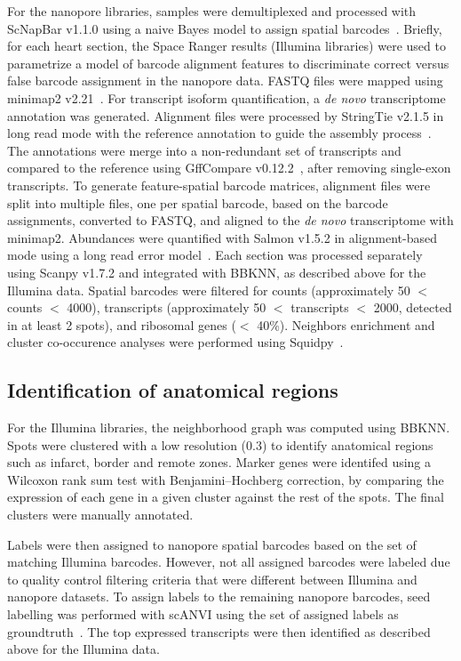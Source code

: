 \documentclass[utf8]{FrontiersinHarvard} %
\newcommand{\denovo}{\textit{de novo}\xspace}
\begin{document}
For the nanopore libraries, samples were demultiplexed and processed with ScNapBar v1.1.0 using a naive Bayes model to assign spatial barcodes~\citep{Wang2021:scnapbar}.
Briefly, for each heart section, the Space Ranger results (Illumina libraries) were used to parametrize a model of barcode alignment features to discriminate correct versus false barcode assignment in the nanopore data. 
FASTQ files were mapped using minimap2 v2.21~\citep{Heng2018:minimap}. 
For transcript isoform quantification, a \denovo transcriptome annotation was generated. 
Alignment files were processed by StringTie v2.1.5 in long read mode with the reference annotation to guide the assembly process~\citep{Kovaka2019:stringtie_long}. 
The annotations were merge into a non-redundant set of transcripts and compared to the reference using GffCompare v0.12.2~\citep{Pertea2020:gff}, after removing single-exon transcripts. 
To generate feature-spatial barcode matrices, alignment files were split into multiple files, one per spatial barcode, based on the barcode assignments, converted to FASTQ, and aligned to the \denovo transcriptome with minimap2. 
Abundances were quantified with Salmon v1.5.2 in alignment-based mode using a long read error model~\citep{Patro2017:salmon}. 
Each section was processed separately using Scanpy v1.7.2 and integrated with BBKNN, as described above for the Illumina data.
Spatial barcodes were filtered for counts (approximately 50 $<$ counts $<$ 4000), transcripts (approximately 50 $<$ transcripts $<$ 2000, detected in at least 2 spots), and ribosomal genes ($<$ 40\%).
Neighbors enrichment and cluster co-occurence analyses were performed using Squidpy~\citep{Palla202:squidpy}.

\subsection*{Identification of anatomical regions}
For the Illumina libraries, the neighborhood graph was computed using BBKNN. Spots were clustered with a low resolution (0.3) to identify anatomical regions such as infarct, border and remote zones. Marker genes were identifed using a Wilcoxon rank sum test with Benjamini–Hochberg correction, by comparing the expression of each gene in a given cluster against the rest of the spots. The final clusters were manually annotated.

Labels were then assigned to nanopore spatial barcodes based on the set of matching Illumina barcodes. 
However, not all assigned barcodes were labeled due to quality control filtering criteria that were different between Illumina and nanopore datasets. 
To assign labels to the remaining nanopore barcodes, seed labelling was performed with scANVI using the set of assigned labels as groundtruth~\citep{Xu2021:scANVI}.
The top expressed transcripts were then identified as described above for the Illumina data.
\end{document}
